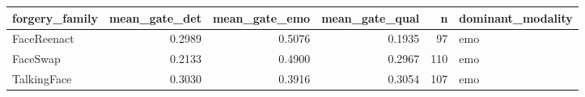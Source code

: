 \begin{tabular}{lrrrrl}
\toprule
forgery_family & mean_gate_det & mean_gate_emo & mean_gate_qual & n & dominant_modality \\
\midrule
FaceReenact & 0.2989 & 0.5076 & 0.1935 & 97 & emo \\
FaceSwap & 0.2133 & 0.4900 & 0.2967 & 110 & emo \\
TalkingFace & 0.3030 & 0.3916 & 0.3054 & 107 & emo \\
\bottomrule
\end{tabular}
